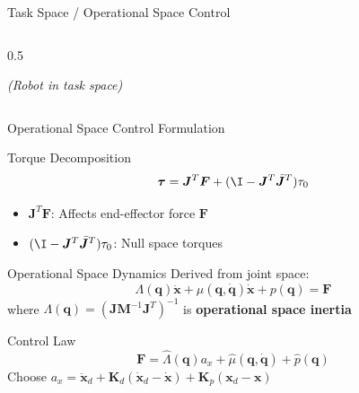 \documentclass[10pt]{beamer}
\newcommand{\vect}[1]{\boldsymbol{#1}}
\newcommand{\M}{\vect{M}}
\newcommand{\q}{\vect{q}}
\newcommand{\qdot}{\dot{\vect{q}}}
\newcommand{\tauvec}{\vect{\tau}}
\newcommand{\x}{\vect{x}}
\newcommand{\J}{\vect{J}}
\newcommand{\F}{\vect{F}}
\newcommand{\Kp}{\vect{K}_p}
\newcommand{\Kd}{\vect{K}_d}
\begin{document}
\begin{frame}{Task Space / Operational Space Control}
\begin{columns}
\begin{column}{0.5\textwidth}
\begin{center}
                \footnotesize\textit{(Robot in task space)}
            \end{center}
        \end{column}
    \end{columns}
\end{frame}

\begin{frame}{Operational Space Control Formulation}
    \begin{block}{Torque Decomposition}
        \[
        \tauvec = \J^T\F + (\I - \J^T\bar{\J}^T)\tau_0
        \]
        \begin{itemize}
            \item $\J^T\F$: Affects end-effector force $\F$
            \item $(\I - \J^T\bar{\J}^T)\tau_0$: Null space torques
        \end{itemize}
    \end{block}
    
    \begin{block}{Operational Space Dynamics}
        Derived from joint space:
        \[
        \Lambda(\q)\ddot{\x} + \mu(\q,\qdot)\dot{\x} + p(\q) = \F
        \]
        where $\Lambda(\q) = (\J\M^{-1}\J^T)^{-1}$ is \textbf{operational space inertia}
    \end{block}
    
    \begin{block}{Control Law}
        \[
        \F = \hat{\Lambda}(\q)a_x + \hat{\mu}(\q,\qdot) + \hat{p}(\q)
        \]
        Choose $a_x = \ddot{\x}_d + \Kd(\dot{\x}_d - \dot{\x}) + \Kp(\x_d - \x)$
    \end{block}
\end{frame}
\end{document}
